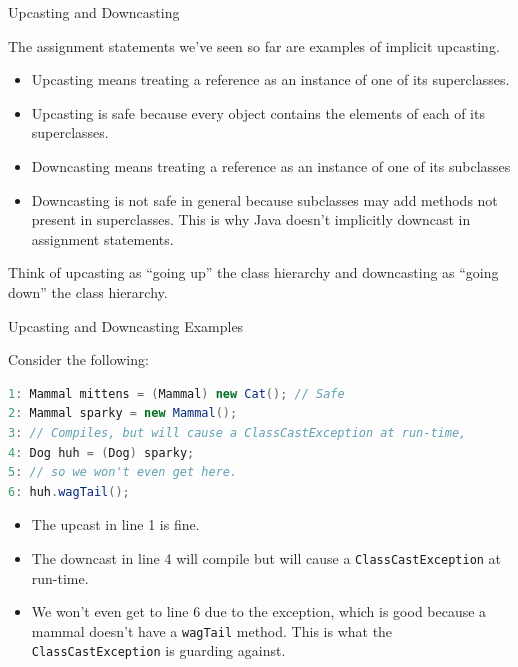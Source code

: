 \documentclass{beamer}
\begin{document}
\begin{frame}[fragile]{Upcasting and Downcasting}


The assignment statements we've seen so far are examples of implicit upcasting.
\begin{itemize}
\item Upcasting means treating a reference as an instance of one of its superclasses.
\item Upcasting is safe because every object contains the elements of each of its superclasses.
\item Downcasting means treating a reference as an instance of one of its subclasses
\item Downcasting is not safe in general because subclasses may add methods not present in superclasses.  This is why Java doesn't implicitly downcast in assignment statements.
\end{itemize}
Think of upcasting as ``going up'' the class hierarchy and downcasting as ``going down'' the class hierarchy.


\end{frame}

\begin{frame}[fragile]{Upcasting and Downcasting Examples}


Consider the following:
\begin{lstlisting}[language=Java]
1: Mammal mittens = (Mammal) new Cat(); // Safe
2: Mammal sparky = new Mammal();
3: // Compiles, but will cause a ClassCastException at run-time,
4: Dog huh = (Dog) sparky;
5: // so we won't even get here.
6: huh.wagTail();
\end{lstlisting}

\begin{itemize}
\item The upcast in line 1 is fine.
\item The downcast in line 4 will compile but will cause a {\tt ClassCastException} at run-time.
\item We won't even get to line 6 due to the exception, which is good because a mammal doesn't have a {\tt wagTail} method.  This is what the {\tt ClassCastException} is guarding against.
\end{itemize}


\end{frame}
\end{document}
